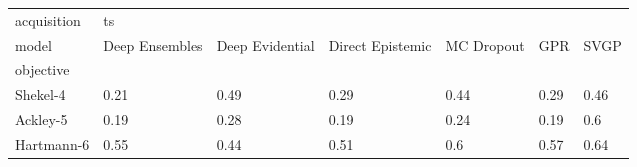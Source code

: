 \begin{tabular}{lllllll}
\toprule
acquisition & \multicolumn{6}{l}{ts} \\
model & Deep Ensembles & Deep Evidential & Direct Epistemic & MC Dropout &   GPR &  SVGP \\
objective  &                &                 &                  &            &       &       \\
\midrule
Shekel-4   &           0.21 &            0.49 &             0.29 &       0.44 &  0.29 &  0.46 \\
Ackley-5   &           0.19 &            0.28 &             0.19 &       0.24 &  0.19 &   0.6 \\
Hartmann-6 &           0.55 &            0.44 &             0.51 &        0.6 &  0.57 &  0.64 \\
\bottomrule
\end{tabular}
